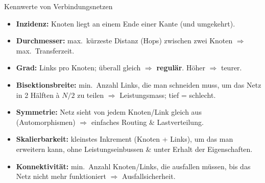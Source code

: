 \documentclass[a4paper, fontsize=7pt]{scrartcl}
\begin{document}
\begin{mainbox}{Kennwerte von Verbindungsnetzen}
\begin{itemize}
    \item \textbf{Inzidenz:} Knoten liegt an einem Ende einer Kante (und
          umgekehrt).
    \item \textbf{Durchmesser:} max.\ kürzeste Distanz (Hops) zwischen zwei
          Knoten $\Rightarrow$ max.\ Transferzeit.
    \item \textbf{Grad:} Links pro Knoten; überall gleich $\Rightarrow$
          \textbf{regulär}. Höher $\Rightarrow$ teurer.
    \item \textbf{Bisektionsbreite:} min.\ Anzahl Links, die man schneiden
          muss, um das Netz in 2 Hälften à $N/2$ zu teilen $\Rightarrow$
          Leistungsmass; tief = schlecht.
    \item \textbf{Symmetrie:} Netz sieht von jedem Knoten/Link gleich aus
          (Automorphismen) $\Rightarrow$ einfaches Routing \& Lastverteilung.
    \item \textbf{Skalierbarkeit:} kleinstes Inkrement (Knoten + Links), um
          das man erweitern kann, ohne Leistungseinbussen \& unter Erhalt der
          Eigenschaften.
    \item \textbf{Konnektivität:} min.\ Anzahl Knoten/Links, die ausfallen
          müssen, bis das Netz nicht mehr funktioniert $\Rightarrow$
          Ausfallsicherheit.
\end{itemize}
\end{mainbox}
\end{document}
